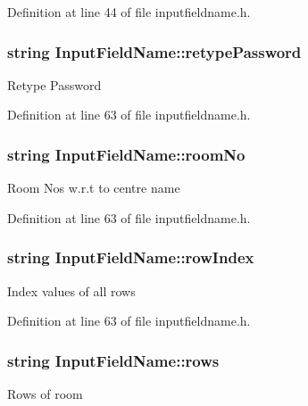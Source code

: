 \-Definition at line 44 of file inputfieldname.\-h.

\hypertarget{classInputFieldName_acd50095ae8540a735bcd5787b904b06c}{
\subsubsection[{retype\-Password}]{\setlength{\rightskip}{0pt plus 5cm}string {\bf \-Input\-Field\-Name\-::retype\-Password}}}\label{classInputFieldName_acd50095ae8540a735bcd5787b904b06c}
\-Retype \-Password 

\-Definition at line 63 of file inputfieldname.\-h.

\hypertarget{classInputFieldName_abb6b245e03e76aa29d7ef8733298e72f}{
\subsubsection[{room\-No}]{\setlength{\rightskip}{0pt plus 5cm}string {\bf \-Input\-Field\-Name\-::room\-No}}}\label{classInputFieldName_abb6b245e03e76aa29d7ef8733298e72f}
\-Room \-Nos w.\-r.\-t to centre name 

\-Definition at line 63 of file inputfieldname.\-h.

\hypertarget{classInputFieldName_adfb1d136313267eecabe30391a03b49b}{
\subsubsection[{row\-Index}]{\setlength{\rightskip}{0pt plus 5cm}string {\bf \-Input\-Field\-Name\-::row\-Index}}}\label{classInputFieldName_adfb1d136313267eecabe30391a03b49b}
\-Index values of all rows 

\-Definition at line 63 of file inputfieldname.\-h.

\hypertarget{classInputFieldName_a1b5a819437f52b4bb6b0ea59f542f9a9}{
\subsubsection[{rows}]{\setlength{\rightskip}{0pt plus 5cm}string {\bf \-Input\-Field\-Name\-::rows}}}\label{classInputFieldName_a1b5a819437f52b4bb6b0ea59f542f9a9}
\-Rows of room 

